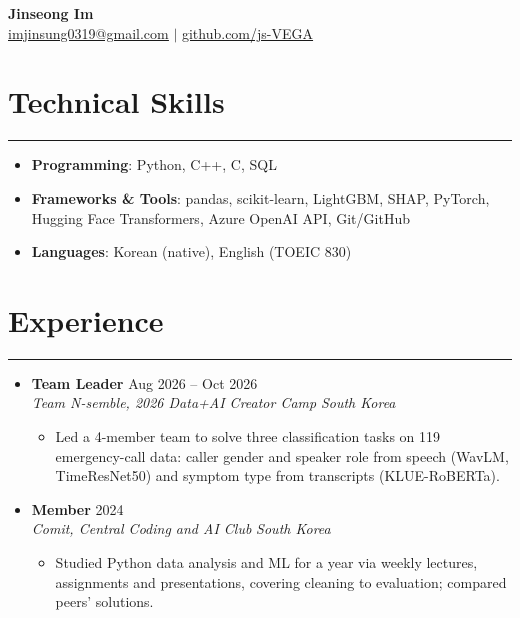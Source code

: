\documentclass[letterpaper, 10pt]{article}
\begin{document}
\begin{center}
    \textbf{\LARGE Jinseong Im} \\ \vspace{2pt}
    \href{mailto:imjinsung0319@gmail.com}{\underline{imjinsung0319@gmail.com}} $|$
    \href{https://github.com/js-VEGA}{\underline{github.com/js-VEGA}}
\end{center}

\section*{Technical Skills}
\hrule
\vspace{4pt}
\begin{itemize}
    \item[] \textbf{Programming}: Python, C++, C, SQL
    \item[] \textbf{Frameworks \& Tools}: pandas, scikit-learn, LightGBM, SHAP, PyTorch, Hugging Face Transformers, Azure OpenAI API, Git/GitHub
    \item[] \textbf{Languages}: Korean (native), English (TOEIC 830)
\end{itemize}

\section*{Experience}
\hrule
\vspace{4pt}
\begin{itemize}
    \item[]
        \textbf{Team Leader} \hfill Aug 2026 -- Oct 2026 \\
        \textit{Team N-semble, 2026 Data+AI Creator Camp} \hfill \textit{South Korea}
        \begin{itemize}
            \item Led a 4-member team to solve three classification tasks on 119 emergency-call data: caller gender and speaker role from speech (WavLM, TimeResNet50) and symptom type from transcripts (KLUE-RoBERTa).
        \end{itemize}
    \item[]
        \textbf{Member} \hfill 2024 \\
        \textit{Comit, Central Coding and AI Club} \hfill \textit{South Korea}
        \begin{itemize}
            \item Studied Python data analysis and ML for a year via weekly lectures, assignments and presentations, covering cleaning to evaluation; compared peers' solutions.
        \end{itemize}
\end{itemize}
\end{document}
